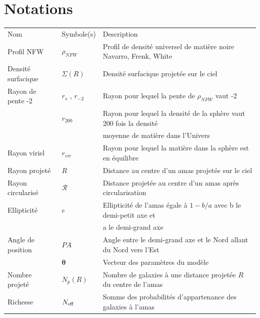 \documentclass[a4paper,11pt]{article}
\numberwithin{equation}{section}
\begin{document}
\newpage

\tableofcontents

\newpage

\section*{Notations}
\begin{tabular}{l l l}
  Nom & Symbole(s) & Description \\
  Profil NFW & $\rho_{NFW}$ & Profil de densité universel de matière noire Navarro, Frenk, White \\
  Densité surfacique & $\Sigma (R)$ & Densité surfacique projetée sur le ciel \\
  Rayon de pente -2 &  $r_s$ , $r_{-2}$ & Rayon pour lequel la pente de $\rho_{NFW}$ vaut -2 \\
  & $r_{200}$ & Rayon pour lequel la densité de la sphère vaut 200 fois la densité \\
  & & moyenne de matière dans l'Univers \\
  Rayon viriel & $r_{vir}$ & Rayon pour lequel la matière dans la sphère est en équilibre \\
  Rayon projeté & $R$ & Distance au centre d'un amas projetée sur le ciel \\
  Rayon circularisé & $\mathscr{R}$ & Distance projetée au centre d'un amas après circularisation \\
  Ellipticité & $e$ & Ellipticité de l'amas égale à $1 - b/a$ avec b le demi-petit axe et \\
  & & a le demi-grand axe \\
  Angle de position & $PA$ & Angle entre le demi-grand axe et le Nord allant du Nord vers l'Est \\
  & $\bm{\theta}$ & Vecteur des paramètres du modèle \\
  Nombre projeté & $N_p (R)$ & Nombre de galaxies à une distance projetée $R$ du centre de l'amas \\
  Richesse & $N_{\rm{eff}}$ & Somme des probabilités d'appartenance des galaxies à l'amas \\
  
\end{tabular}
\end{document}
